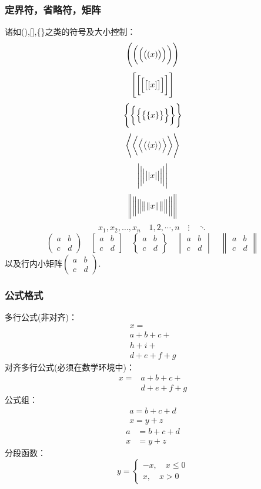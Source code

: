 \documentclass[UTF8]{ctexart}
\begin{document}
\subsubsection{定界符，省略符，矩阵}
诸如(),[],\{\}之类的符号及大小控制：
\[ \Biggl(\biggl(\Bigl(\bigl((x)\bigr)\Bigr)\biggr)\Biggr) \]
\[ \Biggl[\biggl[\Bigl[\bigl[[x]\bigr]\Bigr]\biggr]\Biggr] \]
\[ \Biggl \{\biggl \{\Bigl \{\bigl \{\{x\}\bigr \}\Bigr \}\biggr \}\Biggr\} \]
\[ \Biggl\langle\biggl\langle\Bigl\langle\bigl\langle\langle x
\rangle\bigr\rangle\Bigr\rangle\biggr\rangle\Biggr\rangle \]
\[ \Biggl\lvert\biggl\lvert\Bigl\lvert\bigl\lvert\lvert x
\rvert\bigr\rvert\Bigr\rvert\biggr\rvert\Biggr\rvert \]
\[ \Biggl\lVert\biggl\lVert\Bigl\lVert\bigl\lVert\lVert x
\rVert\bigr\rVert\Bigr\rVert\biggr\rVert\Biggr\rVert \]
\[ x_1,x_2,\dots ,x_n\quad 1,2,\cdots ,n\quad \vdots\quad \ddots \]
\[ \begin{pmatrix} a&b\\c&d \end{pmatrix} \quad
\begin{bmatrix} a&b\\c&d \end{bmatrix} \quad
\begin{Bmatrix} a&b\\c&d \end{Bmatrix} \quad
\begin{vmatrix} a&b\\c&d \end{vmatrix} \quad
\begin{Vmatrix} a&b\\c&d \end{Vmatrix} \]
以及行内小矩阵$ ( \begin{smallmatrix} a&b\\c&d \end{smallmatrix} ) $.

\subsubsection{公式格式}
多行公式(非对齐)：
\begin{multline}
	x=\\
	a+b+c+\\
	h+i+\\
	d+e+f+g
\end{multline}
对齐多行公式(必须在数学环境中)：
\[\begin{aligned}
	x ={}& a+b+c+{} \\
	&d+e+f+g
\end{aligned}\]
公式组：
\begin{gather}
	a = b+c+d \\
	x = y+z
\end{gather}
\begin{align}
	a &= b+c+d \\
	x &= y+z
\end{align}
分段函数：
\[ y= \begin{cases}
	-x,\quad x\leq 0 \\
	x,\quad x>0
\end{cases} \]
\end{document}
